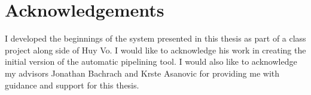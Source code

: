 \section{Acknowledgements}
I developed the beginnings of the system presented in this thesis as part of a class project along side of Huy Vo. I would like to acknowledge his work in creating the initial version of the automatic pipelining tool. I would also like to acknowledge my advisors Jonathan Bachrach and Krste Asanovic for providing me with guidance and support for this thesis.

